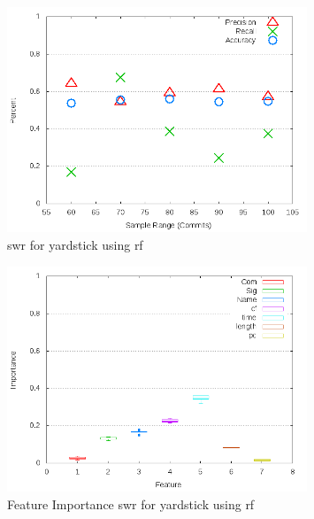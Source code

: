 \begin{figure}
\centering
\includegraphics[width=0.8\textwidth]{images/rf/test_1/yardstick_sample_range.png}
\caption{\gls{swr} for yardstick using \gls{rf}}
\label{fig:test_1_yardstick_rf}
\end{figure}

\clearpage

\begin{figure}[!t]
\centering
\includegraphics[width=0.8\textwidth]{images/rf/test_1/yardstick_importance.png}
\caption{Feature Importance \gls{swr} for yardstick using \gls{rf}}
\label{fig:test_1_yardstick_rf_importance}
\end{figure}

